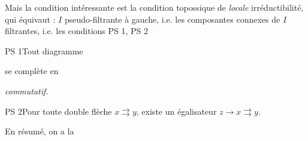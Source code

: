 \documentclass[11pt]{article}
\newcommand{\printedpage}[1]{\marginpar{\footnotesize p.~#1}}
\newcommand{\msp}[1]{\marginpar{\footnotesize [#1]}}
\begin{document}
Mais la condition intéressante est la condition topossique de \textit{locale} irréductibilité, qui équivaut : $I$ pseudo-filtrante à gauche, i.e. les composantes connexes de $I$ filtrantes, i.e. les conditions PS 1, PS 2

PS 1\enspace Tout diagramme  se complète en  \textit{commutatif.}

PS 2\enspace Pour toute double flèche $x \rightrightarrows y$, existe un égalisateur $z \longrightarrow x \rightrightarrows y$.

\printedpage{9}

\msp{page 14}

En résumé, on a la
\end{document}
